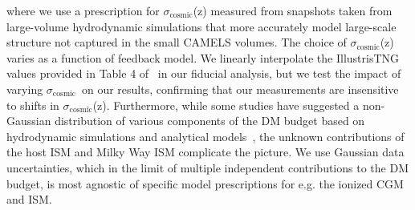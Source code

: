 \documentclass[twocolumn,linenumbers]{aastex631}
\newcommand{\sigmacosmic}{\ensuremath{{\sigma}_\textrm{cosmic}}}
\begin{document}
where we use a prescription for \sigmacosmic(z) measured from snapshots taken from large-volume hydrodynamic simulations that more accurately model large-scale structure not captured in the small CAMELS volumes.
The choice of \sigmacosmic(z) varies as a function of feedback model.
We linearly interpolate the IllustrisTNG values provided in Table 4 of~\citet{walker2024dispersion} in our fiducial analysis, but we test the impact of varying \sigmacosmic\ on our results, confirming that our measurements are insensitive to shifts in \sigmacosmic(z).
Furthermore, while some studies have suggested a non-Gaussian distribution of various components of the DM budget based on hydrodynamic simulations and analytical models~\citep{mcquinn2014locating,medlock2024probing,reischke2024analytical,theis2024galaxy,sharma2025hydrodynamical}, the unknown contributions of the host ISM and Milky Way ISM complicate the picture.
We use Gaussian data uncertainties, which in the limit of multiple independent contributions to the DM budget, is most agnostic of specific model prescriptions for e.g. the ionized CGM and ISM.
\end{document}

